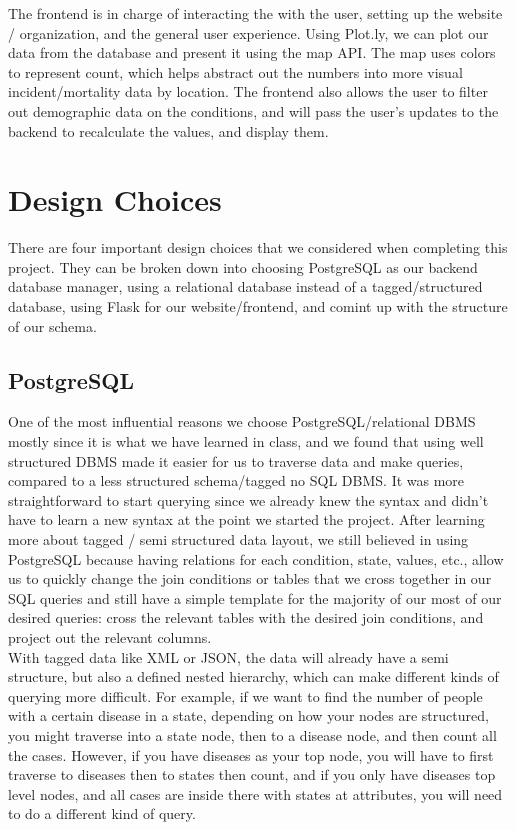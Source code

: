 \documentclass[12pt]{article}
\begin{document}
The frontend is in charge of interacting the with the user, setting up the website / organization, and the general user experience. Using Plot.ly, we can plot our data from the database and present it using the map API. The map uses colors to represent count, which helps abstract out the numbers into more visual incident/mortality data by location. The frontend also allows the user to filter out demographic data on the conditions, and will pass the user's updates to the backend to recalculate the values, and display them.\\
\section{Design Choices}
There are four important design choices that we considered when completing this project. They can be broken down into choosing PostgreSQL as our backend database manager, using a relational database instead of a tagged/structured database, using Flask for our website/frontend, and comint up with the structure of our schema.\\
\subsection{PostgreSQL}
One of the most influential reasons we choose PostgreSQL/relational DBMS mostly since it is what we have learned in class, and we found that using well structured DBMS made it easier for us to traverse data and make queries, compared to a less structured schema/tagged no SQL DBMS. It was more straightforward to start querying since we already knew the syntax and didn't have to learn a new syntax at the point we started the project. After learning more about tagged / semi structured data layout, we still believed in using PostgreSQL because having relations for each condition, state, values, etc., allow us to quickly change the join conditions or tables that we cross together in our SQL queries and still have a simple template for the majority of our most of our desired queries: cross the relevant tables with the desired join conditions, and project out the relevant columns.\\

With tagged data like XML or JSON, the data will already have a semi structure, but also a defined nested hierarchy, which can make different kinds of querying more difficult. For example, if we want to find the number of people with a certain disease in a state, depending on how your nodes are structured, you might traverse into a state node, then to a disease node, and then count all the cases. However, if you have diseases as your top node, you will have to first traverse to diseases then to states then count, and if you only have diseases top level nodes, and all cases are inside there with states at attributes, you will need to do a different kind of query.\\
\end{document}
